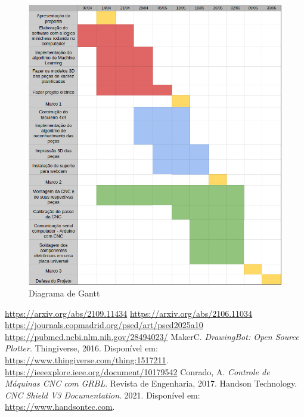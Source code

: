 \documentclass[a4paper,12pt]{article}
\begin{document}
\vspace{1em}  

\begin{figure}[H]  
    \centering  
    \includegraphics[width=1\textwidth]{images/cronograma2.jpg}   
    \caption{Diagrama de Gantt}  
    \label{fig:cronograma_projeto}  
\end{figure}  

\vspace{1em}  

\begin{thebibliography}{9}  
 \href{https://arxiv.org/abs/2109.11434}{https://arxiv.org/abs/2109.11434}  
 \href{https://arxiv.org/abs/2106.11034}{https://arxiv.org/abs/2106.11034}  
 \href{https://journals.copmadrid.org/psed/art/psed2025a10}{https://journals.copmadrid.org/psed/art/psed2025a10}  
 \href{https://pubmed.ncbi.nlm.nih.gov/28494023/}{https://pubmed.ncbi.nlm.nih.gov/28494023/}  
 MakerC. \textit{DrawingBot: Open Source Plotter}. Thingiverse, 2016. Disponível em: \url{https://www.thingiverse.com/thing:1517211}.  
 \url{https://ieeexplore.ieee.org/document/10179542}
 Conrado, A. \textit{Controle de Máquinas CNC com GRBL}. Revista de Engenharia, 2017.  
 Handson Technology. \textit{CNC Shield V3 Documentation}. 2021. Disponível em: \url{https://www.handsontec.com}.  
\end{thebibliography}  
\end{document}
